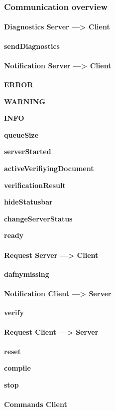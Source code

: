 \subsubsection{Communication overview}

\paragraph{Diagnostics Server ---> Client}

\textbf{sendDiagnostics}

\paragraph{Notification Server ---> Client}

\textbf{ERROR}

\textbf{WARNING}

\textbf{INFO}

\textbf{queueSize}

\textbf{serverStarted}

\textbf{activeVerifiyingDocument}

\textbf{verificationResult}

\textbf{hideStatusbar}

\textbf{changeServerStatus}

\textbf{ready}

\paragraph{Request Server ---> Client}

\textbf{dafnymissing}


\paragraph{Notification Client ---> Server}

\textbf{verify}

\paragraph{Request Client ---> Server}

\textbf{reset}

\textbf{compile}

\textbf{stop}


\paragraph{Commands Client}

